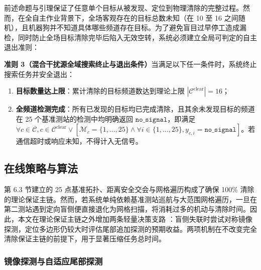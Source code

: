 \documentclass[zihao=-4,a4paper,UTF8]{ctexart}
\begin{document}
前述命题与引理保证了任意单个目标从被发现、定位到物理清除的完整过程。然而，在全自主作业背景下，全场客观存在的目标总数未知（在 10 至 16 之间随机），且机器狗并不知道具体哪些频道存在目标。为了避免盲目过早停工造成漏检，同时防止全场目标清除完毕后陷入无效空转，系统必须建立全局可判定的自主退出准则：

\noindent\textbf{准则 3（混合干扰源全域搜索终止与退出条件）}\quad 当满足以下任一条件时，系统终止搜索任务并安全退出：
\begin{enumerate}[leftmargin=2.2em, itemsep=0.03em, topsep=0.03em]
    \item \textbf{目标数量达上限}：累计清除的目标频道数达到理论上限 $|\mathcal{C}^{\mathrm{clear}}| = 16$；
    \item \textbf{全频道检测完成}：所有已发现的目标均已完成清除，且其余未发现目标的频道在 25 个基准测站的检测中均明确返回 $\texttt{no\_signal}$，即满足 $\forall c \in \mathcal{C}, c \in \mathcal{C}^{\mathrm{clear}} \lor [ \mathcal{M}_c = \{1, \dots, 25\} \land \forall i \in \{1, \dots, 25\}, y_{c,i} = \texttt{no\_signal} ]$。若通信超时或响应未知，不得计入无信号。
\end{enumerate}

\subsection{在线策略与算法}

第 6.3 节建立的 25 点基准拓扑、距离安全交会与网格遍历构成了确保 100\% 清除的理论保证主链。然而，若系统单纯依赖基准测站巡航与大范围网格遍历，一旦在第二测站遇到定向盲侧便直接退化为网格扫描，将消耗过多的机动与清除时间。因此，本文在理论保证主链之外增加两条轻量决策支路 \cite{bercea2016}：盲侧失联时尝试对称镜像探测，定位多边形仍较大时评估尾部追加探测的预期收益。两项机制在不改变完全清除保证主链的前提下，用于显著压缩任务总时间。

\subsubsection{镜像探测与自适应尾部探测}
\end{document}
